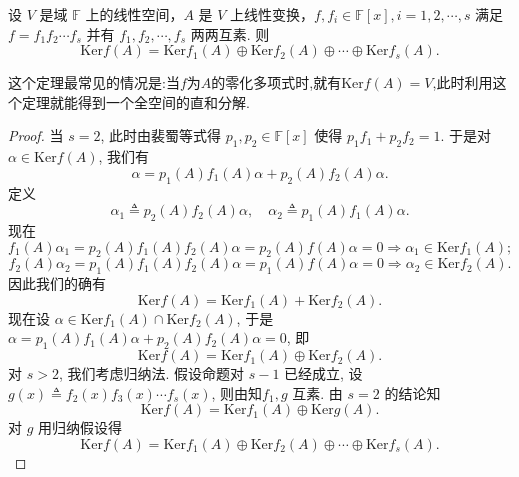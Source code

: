 \documentclass[../../main.tex]{subfiles}%
\begin{document}
\begin{theorem}\label{theorem:线性变换互素分解对应核子空间直和分解}
设 $V$ 是域 $\mathbb{F}$ 上的线性空间，$A$ 是 $V$ 上线性变换，$f, f_i \in \mathbb{F}[x], i = 1,2,\cdots, s$ 满足 $f = f_1f_2\cdots f_s$ 并有 $f_1, f_2, \cdots, f_s$ 两两互素. 则
$$\mathrm{Ker} f(A) = \mathrm{Ker} f_1(A) \oplus \mathrm{Ker} f_2(A) \oplus \cdots \oplus \mathrm{Ker} f_s(A).$$
\end{theorem}
\begin{remark}
这个定理最常见的情况是:当$f$为$A$的零化多项式时,就有$\mathrm{Ker} f(A)=V$,此时利用这个定理就能得到一个全空间的直和分解.
\end{remark}
\begin{proof}
当 $s = 2$, 此时由裴蜀等式得 $p_1, p_2 \in \mathbb{F}[x]$ 使得 $p_1f_1 + p_2f_2 = 1$. 于是对 $\alpha \in \mathrm{Ker} f(A)$, 我们有
$$\alpha = p_1(A)f_1(A)\alpha + p_2(A)f_2(A)\alpha.$$
定义
$$\alpha_1 \triangleq p_2(A)f_2(A)\alpha,\quad \alpha_2 \triangleq p_1(A)f_1(A)\alpha.$$
现在
$$f_1(A)\alpha_1 = p_2(A)f_1(A)f_2(A)\alpha = p_2(A)f(A)\alpha = 0 \Rightarrow \alpha_1 \in \mathrm{Ker} f_1(A);$$
$$f_2(A)\alpha_2 = p_1(A)f_1(A)f_2(A)\alpha = p_1(A)f(A)\alpha = 0 \Rightarrow \alpha_2 \in \mathrm{Ker} f_2(A).$$
因此我们的确有
$$\mathrm{Ker} f(A) = \mathrm{Ker} f_1(A) + \mathrm{Ker} f_2(A).$$
现在设 $\alpha \in \mathrm{Ker} f_1(A) \cap \mathrm{Ker} f_2(A)$, 于是 $\alpha = p_1(A)f_1(A)\alpha + p_2(A)f_2(A)\alpha = 0$, 即
$$\mathrm{Ker} f(A) = \mathrm{Ker} f_1(A) \oplus \mathrm{Ker} f_2(A).$$
对 $s > 2$, 我们考虑归纳法. 假设命题对 $s - 1$ 已经成立, 设 $g(x) \triangleq f_2(x)f_3(x)\cdots f_s(x)$, 则由知$f_1, g$ 互素. 由 $s = 2$ 的结论知
$$\mathrm{Ker} f(A) = \mathrm{Ker} f_1(A) \oplus \mathrm{Ker} g(A).$$
对 $g$ 用归纳假设得
$$\mathrm{Ker} f(A) = \mathrm{Ker} f_1(A) \oplus \mathrm{Ker} f_2(A) \oplus \cdots \oplus \mathrm{Ker} f_s(A).$$
\end{proof}
\end{document}
